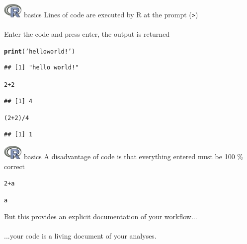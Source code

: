 \documentclass[xcolor=svgnames]{beamer}\usepackage[]{graphicx}\usepackage[]{color}
\makeatletter
\newcommand{\hlnum}[1]{\textcolor[rgb]{0.686,0.059,0.569}{#1}}%
\newcommand{\hlstr}[1]{\textcolor[rgb]{0.192,0.494,0.8}{#1}}%
\newcommand{\hlopt}[1]{\textcolor[rgb]{0,0,0}{#1}}%
\newcommand{\hlstd}[1]{\textcolor[rgb]{0.345,0.345,0.345}{#1}}%
\newcommand{\hlkwd}[1]{\textcolor[rgb]{0.737,0.353,0.396}{\textbf{#1}}}%
\newenvironment{kframe}{%
 \def\at@end@of@kframe{}%
 \ifinner\ifhmode%
  \def\at@end@of@kframe{\end{minipage}}%
  \begin{minipage}{\columnwidth}%
 \fi\fi%
 \def\FrameCommand##1{\hskip\@totalleftmargin \hskip-\fboxsep
 \colorbox{shadecolor}{##1}\hskip-\fboxsep
     \hskip-\linewidth \hskip-\@totalleftmargin \hskip\columnwidth}%
 \MakeFramed {\advance\hsize-\width
   \@totalleftmargin\z@ \linewidth\hsize
   \@setminipage}}%
 {\par\unskip\endMakeFramed%
 \at@end@of@kframe}
\newenvironment{knitrout}{}{} %
\makeatother
\begin{document}
\begin{frame}[fragile]{\includegraphics[width=0.07\textwidth]{Rlogo.jpg} \hspace{0.01in} basics}
Lines of code are executed by R at the prompt (\textit{\texttt{>}})\\~\\
Enter the code and press enter, the output is returned
\begin{knitrout}
\color{fgcolor}\begin{kframe}
\begin{alltt}
\hlkwd{print}\hlstd{(}\hlstr{'hello world!'}\hlstd{)}
\end{alltt}
\begin{verbatim}
## [1] "hello world!"
\end{verbatim}
\begin{alltt}
\hlnum{2} \hlopt{+} \hlnum{2}
\end{alltt}
\begin{verbatim}
## [1] 4
\end{verbatim}
\begin{alltt}
\hlstd{(}\hlnum{2} \hlopt{+} \hlnum{2}\hlstd{)} \hlopt{/} \hlnum{4}
\end{alltt}
\begin{verbatim}
## [1] 1
\end{verbatim}
\end{kframe}
\end{knitrout}
\end{frame}

\begin{frame}[fragile]{\includegraphics[width=0.07\textwidth]{Rlogo.jpg} \hspace{0.01in} basics}
A disadvantage of code is that everything entered must be 100 \% correct
\begin{knitrout}
\color{fgcolor}\begin{kframe}
\begin{alltt}
\hlnum{2} \hlopt{+} \hlstd{a}
\end{alltt}


{\ttfamily\noindent\bfseries\color{errorcolor}{\#\# Error: object 'a' not found}}\begin{alltt}
\hlstd{a}
\end{alltt}


{\ttfamily\noindent\bfseries\color{errorcolor}{\#\# Error: object 'a' not found}}\end{kframe}
\end{knitrout}
\vspace{0.2in}
But this provides an explicit documentation of your workflow...\\~\\
...your code is a living document of your analyses.
\end{frame}
\end{document}
